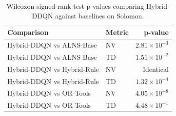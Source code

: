\begin{table}[htbp]
\centering
\caption{Wilcoxon signed-rank test p-values comparing Hybrid-DDQN against baselines on Solomon.}
\label{tab:wilcoxon_solomon}
\begin{tabular}{llr}
\hline
\textbf{Comparison} & \textbf{Metric} & \textbf{p-value} \\ \hline
Hybrid-DDQN vs ALNS-Base & NV & $2.81 \times 10^{-3}$ \\
Hybrid-DDQN vs ALNS-Base & TD & $1.51 \times 10^{-2}$ \\
Hybrid-DDQN vs Hybrid-Rule & NV & Identical \\
Hybrid-DDQN vs Hybrid-Rule & TD & $1.32 \times 10^{-4}$ \\
Hybrid-DDQN vs OR-Tools & NV & $4.05 \times 10^{-8}$ \\
Hybrid-DDQN vs OR-Tools & TD & $4.48 \times 10^{-1}$ \\
\hline
\end{tabular}
\end{table}

